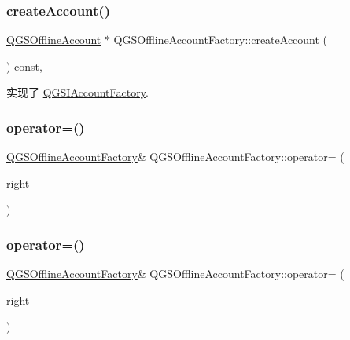 \subsubsection{\texorpdfstring{create\+Account()}{createAccount()}}
{\footnotesize\ttfamily \mbox{\hyperlink{class_q_g_s_offline_account}{Q\+G\+S\+Offline\+Account}} $\ast$ Q\+G\+S\+Offline\+Account\+Factory\+::create\+Account (\begin{DoxyParamCaption}{ }\end{DoxyParamCaption}) const\hspace{0.3cm}{\ttfamily [override]}, {\ttfamily [virtual]}}



实现了 \mbox{\hyperlink{class_q_g_s_i_account_factory_adf21a37bf465543c022b2bee9e61c3fd}{Q\+G\+S\+I\+Account\+Factory}}.

\mbox{\label{class_q_g_s_offline_account_factory_a9b80619b1368a818154423958c0dd70e}} 
\subsubsection{\texorpdfstring{operator=()}{operator=()}\hspace{0.1cm}{\footnotesize\ttfamily [1/2]}}
{\footnotesize\ttfamily \mbox{\hyperlink{class_q_g_s_offline_account_factory}{Q\+G\+S\+Offline\+Account\+Factory}}\& Q\+G\+S\+Offline\+Account\+Factory\+::operator= (\begin{DoxyParamCaption}\item[{const \mbox{\hyperlink{class_q_g_s_offline_account_factory}{Q\+G\+S\+Offline\+Account\+Factory}} \&}]{right }\end{DoxyParamCaption})\hspace{0.3cm}{\ttfamily [delete]}}

\mbox{\label{class_q_g_s_offline_account_factory_aad8f5af758d74a9920e6f5903e37e738}} 
\subsubsection{\texorpdfstring{operator=()}{operator=()}\hspace{0.1cm}{\footnotesize\ttfamily [2/2]}}
{\footnotesize\ttfamily \mbox{\hyperlink{class_q_g_s_offline_account_factory}{Q\+G\+S\+Offline\+Account\+Factory}}\& Q\+G\+S\+Offline\+Account\+Factory\+::operator= (\begin{DoxyParamCaption}\item[{\mbox{\hyperlink{class_q_g_s_offline_account_factory}{Q\+G\+S\+Offline\+Account\+Factory}} \&\&}]{right }\end{DoxyParamCaption})\hspace{0.3cm}{\ttfamily [delete]}}



